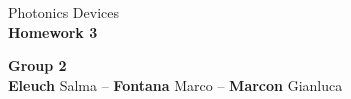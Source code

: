 \documentclass[english, 11pt]{article}
\begin{document}
	\begin{center}
		\Large Photonics Devices\\
		\huge \textbf{Homework 3}\\[3mm]
		\begin{framed}
			\Large \textbf{Group 2} \\[2mm]
			\normalsize \textbf{Eleuch} Salma --  \textbf{Fontana} Marco -- \textbf{Marcon} Gianluca
		\end{framed}
	\end{center}	
	\FloatBarrier	
	

	
	
%	
%	
%	
%	
%	
%	

	
	
\end{document}
